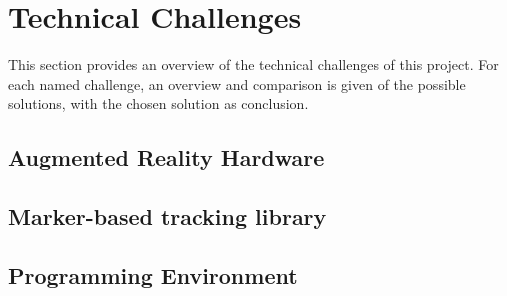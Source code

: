 \section{Technical Challenges} \label{sec:technicalchallenges}
	This section provides an overview of the technical challenges of 
	this project. For each named challenge, an overview and comparison is 
	given of the possible solutions, with the chosen solution as conclusion.
	
	\subsection{Augmented Reality Hardware} \label{ssec:arhardware}
	
	\subsection{Marker-based tracking library} \label{ssec:trackinglib}
	
	\subsection{Programming Environment} \label{ssec:programmingenvironment}
	
